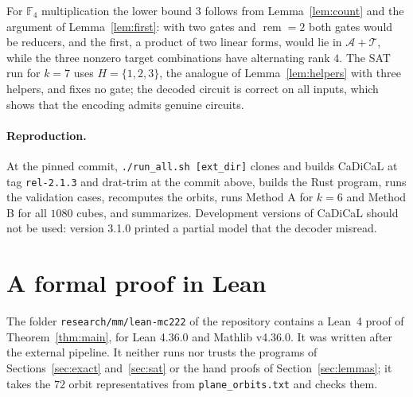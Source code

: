 \documentclass[11pt,a4paper]{article}
\theoremstyle{definition}
\newcommand{\F}{\mathbb{F}}
\newcommand{\Aff}{\mathcal{A}}
\newcommand{\Tg}{\mathcal{T}}
\newcommand{\rem}{\operatorname{rem}}
\newcommand{\code}[1]{\texttt{#1}}
\begin{document}
For $\F_4$ multiplication the lower bound $3$ follows from Lemma~\ref{lem:count} and the argument of Lemma~\ref{lem:first}: with two gates and $\rem=2$ both gates would be reducers, and the first, a product of two linear forms, would lie in $\Aff+\Tg$, while the three nonzero target combinations have alternating rank $4$. The SAT run for $k=7$ uses $H=\{1,2,3\}$, the analogue of Lemma~\ref{lem:helpers} with three helpers, and fixes no gate; the decoded circuit is correct on all inputs, which shows that the encoding admits genuine circuits.

\paragraph{Reproduction.} At the pinned commit, \code{./run\_all.sh [ext\_dir]} clones and builds CaDiCaL at tag \code{rel-2.1.3} and drat-trim at the commit above, builds the Rust program, runs the validation cases, recomputes the orbits, runs Method A for $k=6$ and Method B for all $1080$ cubes, and summarizes. Development versions of CaDiCaL should not be used: version 3.1.0 printed a partial model that the decoder misread.

\section{A formal proof in Lean}\label{sec:lean}

The folder \code{research/mm/lean-mc222} of the repository contains a Lean~4 proof of Theorem~\ref{thm:main}, for Lean 4.36.0 and Mathlib v4.36.0. It was written after the external pipeline. It neither runs nor trusts the programs of Sections~\ref{sec:exact} and~\ref{sec:sat} or the hand proofs of Section~\ref{sec:lemmas}; it takes the $72$ orbit representatives from \code{plane\_orbits.txt} and checks them.
\end{document}
